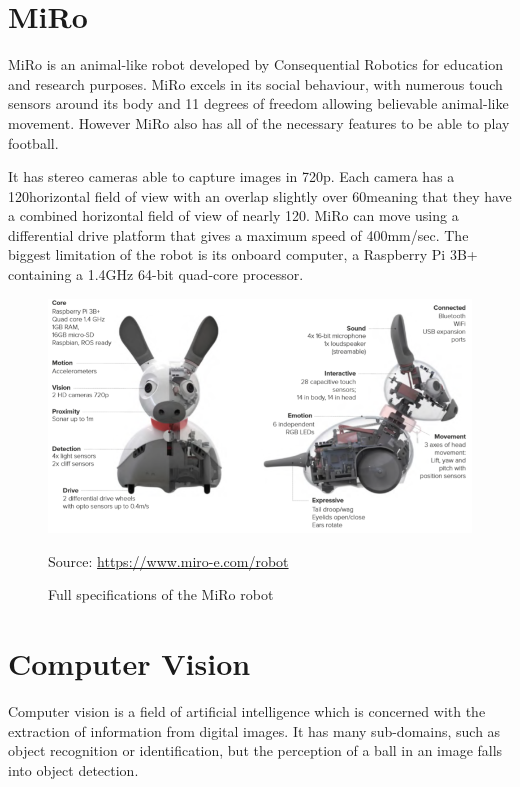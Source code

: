 \section{MiRo}

MiRo is an animal-like robot developed by Consequential Robotics for education and research purposes. MiRo excels in its social behaviour, with numerous touch sensors around its body and 11 degrees of freedom allowing believable animal-like movement. However MiRo also has all of the necessary features to be able to play football. 

It has stereo cameras able to capture images in 720p. Each camera has a 120\degree horizontal field of view with an overlap slightly over 60\degree meaning that they have a combined horizontal field of view of nearly 120\degree. MiRo can move using a differential drive platform that gives a maximum speed of 400mm/sec. The biggest limitation of the robot is its onboard computer, a Raspberry Pi 3B+ containing a 1.4GHz 64-bit quad-core processor. 

\begin{figure}[H]
    \centering
    \includegraphics[width=12cm]{images/miro-specs.png}
    \caption{Full specifications of the MiRo robot}
    \label{fig:miro specs}
    Source: \url{https://www.miro-e.com/robot}
\end{figure}

\section{Computer Vision}

Computer vision is a field of artificial intelligence which is concerned with the extraction of information from digital images. It has many sub-domains, such as object recognition or identification, but the perception of a ball in an image falls into object detection. 

